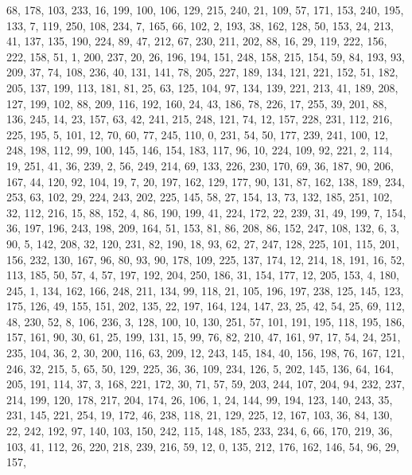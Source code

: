 \begin{DoxyCode}
       68, 178, 103, 233, 16, 199, 100, 106, 129, 215, 240, 21, 109, 57, 171, 153, 240, 195, 133, 7, 119, 250, 108,
       234, 7, 165, 66, 102, 2, 193, 38, 162, 128, 50, 153, 24, 213, 41, 137, 135, 190, 224, 89, 47, 212, 67, 230,
       211, 202, 88, 16, 29, 119, 222, 156, 222, 158, 51, 1, 200, 237, 20, 26, 196, 194, 151, 248, 158, 215, 154,
       59, 84, 193, 93, 209, 37, 74, 108, 236, 40, 131, 141, 78, 205, 227, 189, 134, 121, 221, 152, 51, 182, 205,
       137, 199, 113, 181, 81, 25, 63, 125, 104, 97, 134, 139, 221, 213, 41, 189, 208, 127, 199, 102, 88, 209, 116,
       192, 160, 24, 43, 186, 78, 226, 17, 255, 39, 201, 88, 136, 245, 14, 23, 157, 63, 42, 241, 215, 248, 121, 74,
       12, 157, 228, 231, 112, 216, 225, 195, 5, 101, 12, 70, 60, 77, 245, 110, 0, 231, 54, 50, 177, 239, 241, 100,
       12, 248, 198, 112, 99, 100, 145, 146, 154, 183, 117, 96, 10, 224, 109, 92, 221, 2, 114, 19, 251, 41, 36,
       239, 2, 56, 249, 214, 69, 133, 226, 230, 170, 69, 36, 187, 90, 206, 167, 44, 120, 92, 104, 19, 7, 20, 197,
       162, 129, 177, 90, 131, 87, 162, 138, 189, 234, 253, 63, 102, 29, 224, 243, 202, 225, 145, 58, 27, 154, 13, 73,
       132, 185, 251, 102, 32, 112, 216, 15, 88, 152, 4, 86, 190, 199, 41, 224, 172, 22, 239, 31, 49, 199, 7, 154,
       36, 197, 196, 243, 198, 209, 164, 51, 153, 81, 86, 208, 86, 152, 247, 108, 132, 6, 3, 90, 5, 142, 208, 32,
       120, 231, 82, 190, 18, 93, 62, 27, 247, 128, 225, 101, 115, 201, 156, 232, 130, 167, 96, 80, 93, 90, 178,
       109, 225, 137, 174, 12, 214, 18, 191, 16, 52, 113, 185, 50, 57, 4, 57, 197, 192, 204, 250, 186, 31, 154, 177,
       12, 205, 153, 4, 180, 245, 1, 134, 162, 166, 248, 211, 134, 99, 118, 21, 105, 196, 197, 238, 125, 145, 123,
       175, 126, 49, 155, 151, 202, 135, 22, 197, 164, 124, 147, 23, 25, 42, 54, 25, 69, 112, 48, 230, 52, 8, 106,
       236, 3, 128, 100, 10, 130, 251, 57, 101, 191, 195, 118, 195, 186, 157, 161, 90, 30, 61, 25, 199, 131, 15,
       99, 76, 82, 210, 47, 161, 97, 17, 54, 24, 251, 235, 104, 36, 2, 30, 200, 116, 63, 209, 12, 243, 145, 184, 40,
       156, 198, 76, 167, 121, 246, 32, 215, 5, 65, 50, 129, 225, 36, 36, 109, 234, 126, 5, 202, 145, 136, 64, 164,
       205, 191, 114, 37, 3, 168, 221, 172, 30, 71, 57, 59, 203, 244, 107, 204, 94, 232, 237, 214, 199, 120, 178,
       217, 204, 174, 26, 106, 1, 24, 144, 99, 194, 123, 140, 243, 35, 231, 145, 221, 254, 19, 172, 46, 238, 118,
       21, 129, 225, 12, 167, 103, 36, 84, 130, 22, 242, 192, 97, 140, 103, 150, 242, 115, 148, 185, 233, 234, 6,
       66, 170, 219, 36, 103, 41, 112, 26, 220, 218, 239, 216, 59, 12, 0, 135, 212, 176, 162, 146, 54, 96, 29, 157,

\end{DoxyCode}
